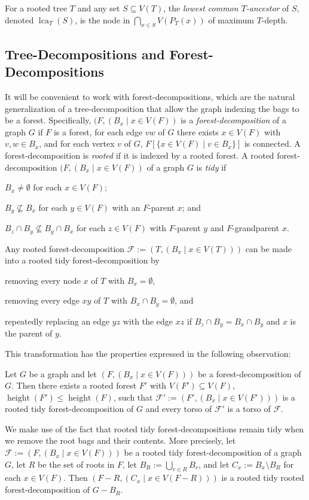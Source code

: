 \documentclass{patmorin}
\renewcommand{\le}{\leqslant}
\newcommand{\defin}[1]{\emph{\textcolor{brightmaroon}{#1}}}
\DeclareMathOperator{\height}{height}
\DeclareMathOperator{\lca}{lca}
\newcommand{\calF}{\mathcal{F}}
\begin{document}
For a rooted tree $T$ and any set $S\subseteq V(T)$, the \defin{lowest common $T$-ancestor} of $S$, denoted \defin{$\lca_T(S)$}, is the node in $\bigcap_{x\in S} V(P_T(x))$ of maximum $T$-depth.

\subsection{Tree-Decompositions and Forest-Decompositions}

It will be convenient to work with forest-decompositions, which are the natural generalization of a tree-decomposition that allow the graph indexing the bags to be a forest.  Specifically, $(F,(B_x\mid x\in V(F))$ is a \defin{forest-decomposition} of a graph $G$ if $F$ is a forest, for each edge $vw$ of $G$ there exists $x\in V(F)$ with $v,w\in B_x$, and for each vertex $v$ of $G$, $F[\{x\in V(F)\mid v\in B_x\}]$ is connected.  A forest-decomposition is \defin{rooted} if it is indexed by a rooted forest.  A rooted forest-decomposition $(F,(B_x\mid x\in V(F))$ of a graph $G$ is \defin{tidy} if
\begin{enumerate*}[label=(\arabic*)]
  \item $B_x\neq\emptyset$ for each $x\in V(F)$;
  \item $B_y\not\subseteq B_x$ for each $y\in V(F)$ with an $F$-parent $x$; and
  \item $B_z \cap B_y \not\subseteq B_y\cap B_x$ for each $z\in V(F)$ with $F$-parent $y$ and $F$-grandparent $x$.
\end{enumerate*}
Any rooted forest-decomposition $\calF:=(T,(B_x\mid x\in V(T)))$ can be made into a rooted tidy forest-decomposition by
\begin{enumerate*}[label=(\arabic*)]
  \item removing every node $x$ of $T$ with $B_x=\emptyset$,
  \item removing every edge $xy$ of $T$ with $B_x\cap B_y=\emptyset$, and
  \item repeatedly replacing an edge $yz$ with the edge $xz$ if $B_z\cap B_y=B_x\cap B_y$ and $x$ is the parent of $y$.
\end{enumerate*} This transformation has the properties expressed in the following observation:
\begin{obs}\label{tidy_forest}
  Let $G$ be a graph and let $(F,(B_x\mid x\in V(F)))$ be a forest-decomposition of $G$. Then there exists a rooted forest $F'$ with $V(F')\subseteq V(F)$, $\height(F')\le\height(F)$, such that $\calF':=(F',(B_x\mid x\in V(F')))$ is a rooted tidy forest-decomposition of $G$ and every torso of $\calF'$ is a torso of $\calF$.
\end{obs}
We make use of the fact that rooted tidy forest-decompositions remain tidy when we remove the root bags and their contents.  More precisely, let $\calF:=(F,(B_x\mid x\in V(F)))$ be a rooted tidy forest-decomposition of a graph $G$, let $R$ be the set of roots in $F$, let $B_R:=\bigcup_{r\in R}B_r$, and let $C_x:=B_x\setminus B_R$ for each $x\in V(F)$.  Then $(F-R,(C_x\mid x\in V(F-R)))$ is a rooted tidy rooted forest-decomposition of $G-B_R$.
\end{document}
